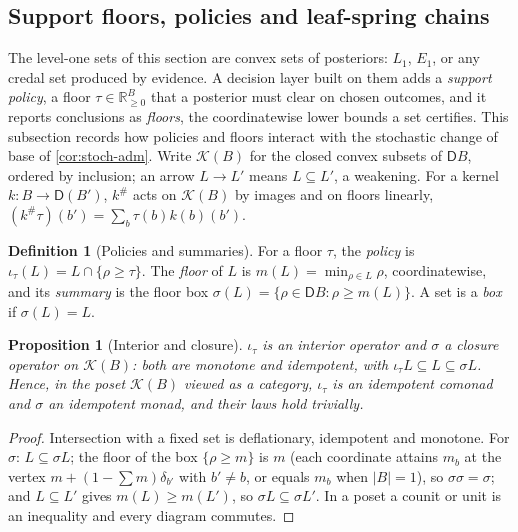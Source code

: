 \documentclass[11pt]{article}
\newtheorem{proposition}[theorem]{Proposition}
\theoremstyle{definition}
\newtheorem{definition}[theorem]{Definition}
\theoremstyle{remark}
\newcommand{\D}{\mathsf{D}}
\begin{document}
\subsection{Support floors, policies and leaf-spring chains}\label{sec:floors}

The level-one sets of this section are convex sets of posteriors: $L_1$, $E_1$, or any credal set produced by evidence. A decision
layer built on them \cite[Section~14]{Awasthi-Validation} adds a \emph{support policy}, a floor $\tau\in\mathbb R_{\ge0}^B$ that a
posterior must clear on chosen outcomes, and it reports conclusions as \emph{floors}, the coordinatewise lower bounds a set
certifies. This subsection records how policies and floors interact with the stochastic change of base of \cref{cor:stoch-adm}.
Write $\mathcal K(B)$ for the closed convex subsets of $\D B$, ordered by inclusion; an arrow $L\to L'$ means $L\subseteq L'$, a
weakening. For a kernel $k\colon B\to\D(B')$, $k^\#$ acts on $\mathcal K(B)$ by images and on floors linearly,
$(k^\#\tau)(b')=\sum_b\tau(b)k(b)(b')$.

\begin{definition}[Policies and summaries]\label{def:policy}
For a floor $\tau$, the \emph{policy} is $\iota_\tau(L)=L\cap\{\rho\ge\tau\}$. The \emph{floor} of $L$ is $m(L)=\min_{\rho\in L}\rho$,
coordinatewise, and its \emph{summary} is the floor box $\sigma(L)=\{\rho\in\D B:\rho\ge m(L)\}$. A set is a \emph{box} if
$\sigma(L)=L$.
\end{definition}

\begin{proposition}[Interior and closure]\label{prop:interior}
$\iota_\tau$ is an interior operator and $\sigma$ a closure operator on $\mathcal K(B)$: both are monotone and idempotent, with
$\iota_\tau L\subseteq L\subseteq\sigma L$. Hence, in the poset $\mathcal K(B)$ viewed as a category, $\iota_\tau$ is an idempotent
comonad and $\sigma$ an idempotent monad, and their laws hold trivially.
\end{proposition}
\begin{proof}
Intersection with a fixed set is deflationary, idempotent and monotone. For $\sigma$: $L\subseteq\sigma L$; the floor of the box
$\{\rho\ge m\}$ is $m$ (each coordinate attains $m_b$ at the vertex $m+(1-\sum m)\delta_{b'}$ with $b'\ne b$, or equals $m_b$
when $|B|=1$), so $\sigma\sigma=\sigma$; and $L\subseteq L'$ gives $m(L)\ge m(L')$, so $\sigma L\subseteq\sigma L'$. In a poset a
counit or unit is an inequality and every diagram commutes.
\end{proof}
\end{document}
